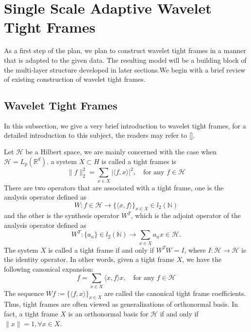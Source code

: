 \documentclass[a4paper]{article}
\begin{document}
\newtheorem{lem}{Lemma}
\newtheorem{prop}{Proposition}
\renewcommand{\a}{\mathbf{a}}
\renewcommand{\v}{\mathbf{v}}

\section{Single Scale Adaptive Wavelet Tight Frames}
As a first step of the plan, we plan to construct wavelet tight frames in a manner that is adapted to the given data. The resulting model will be a building block of the multi-layer structure developed in later sections.We begin with a brief review of existing construction of wavelet tight frames.

\subsection{Wavelet Tight Frames}
In this subsection, we give a very brief introduction to wavelet tight frames, for a detailed introduction to this subject, the readers may refer to [].

Let $\mathcal{H}$ be a Hilbert space, we are mainly concerned with the case when $\mathcal{H}=L_p(\mathbb{R}^d)$. a system $X\subset H$ is called a tight frames is
\[
	\|f\|_2^2 = \sum_{x\in X} |\langle f,x\rangle |^2, \quad \textrm{for any } f\in \mathcal{H}
\]
There are two operators that are associated with a tight frame, one is the analysis operator defined as
\[
	W: f\in \mathcal{H} \rightarrow \{\langle x,f\rangle\}_{x\in X} \in l_2(\mathbb{N})
\]
and the other is the synthesis operator $W^T$, which is the adjoint operator of the analysis operator defined as
\[
	W^T : \{a_n\} \in l_2(\mathbb{N}) \rightarrow \sum_{x\in X} a_n x\in \mathcal{H}.
\]
The system $X$ is called a tight frame if and only if $W^TW=I$, where $I: \mathcal{H} \rightarrow \mathcal{H}$ is the identity operator. In other words, given a tight frame $X$, we have the following canonical expansion:
\[
	f=\sum_{x\in X} \langle x,f\rangle x, \quad \textrm{for any } f\in \mathcal{H}
\]
The sequence $Wf:=\{\langle f,x\rangle \}_{x\in X}$ are called the canonical tight frame coefficients. Thus, tight frames are often viewed as generalizations of orthonormal basis. In fact, a tight frame $X$ is an orthonormal basis for $\mathcal{H}$ if and only if $\|x\|=1,\forall x\in X$.
\end{document}

